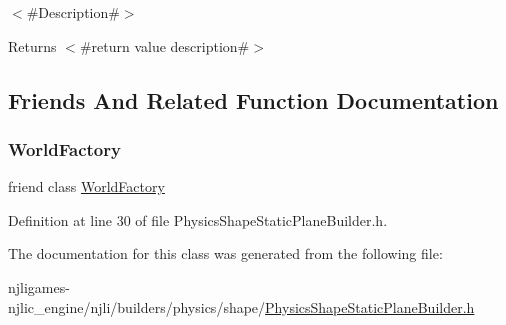 $<$\#\+Description\#$>$

\begin{DoxyReturn}{Returns}
$<$\#return value description\#$>$ 
\end{DoxyReturn}


\subsection{Friends And Related Function Documentation}
\mbox{\label{classnjli_1_1_physics_shape_static_plane_builder_acb96ebb09abe8f2a37a915a842babfac}} 
\subsubsection{\texorpdfstring{World\+Factory}{WorldFactory}}
{\footnotesize\ttfamily friend class \mbox{\hyperlink{classnjli_1_1_world_factory}{World\+Factory}}\hspace{0.3cm}{\ttfamily [friend]}}



Definition at line 30 of file Physics\+Shape\+Static\+Plane\+Builder.\+h.



The documentation for this class was generated from the following file\+:\begin{DoxyCompactItemize}
\item 
njligames-\/njlic\+\_\+engine/njli/builders/physics/shape/\mbox{\hyperlink{_physics_shape_static_plane_builder_8h}{Physics\+Shape\+Static\+Plane\+Builder.\+h}}\end{DoxyCompactItemize}
